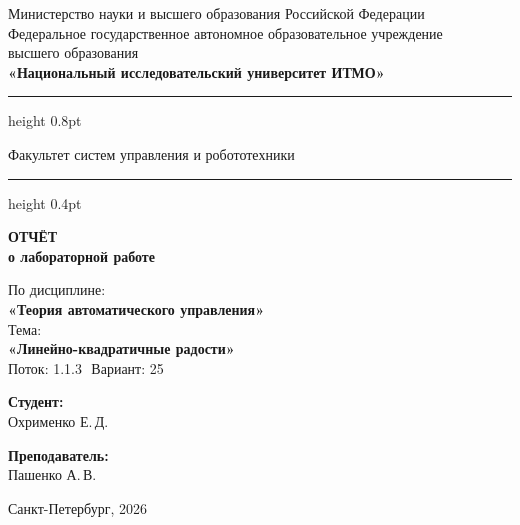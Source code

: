 \documentclass[a4paper,12pt]{article}
\begin{document}
	
	\begin{titlepage}
		\centering
		
		\vspace*{0.5cm}
		{\small
			Министерство науки и высшего образования Российской Федерации\\[2pt]
			Федеральное государственное автономное образовательное учреждение\\
			высшего образования\\[2pt]
			\textbf{«Национальный исследовательский университет ИТМО»}\\
		}
		
		\vspace{0.8cm}
		\hrule height 0.8pt
		\vspace{0.3cm}
		
		{\large Факультет систем управления и робототехники}
		
		\vspace{0.3cm}
		\hrule height 0.4pt
		\vspace{2.5cm}
		
		{\Huge\bfseries ОТЧЁТ}\\[0.4cm]
		{\LARGE\bfseries о лабораторной работе}\\[0.8cm]
		
		\begin{tcolorbox}[
			colback=gray!4,
			colframe=gray!10,
			boxrule=0.8pt,
			arc=4pt,
			left=12pt, right=12pt, top=8pt, bottom=8pt
			]
			\centering
			{\large По дисциплине:\\[4pt]}
			{\large\bfseries «Теория автоматического управления»}\\[10pt]
			{\large Тема:\\[4pt]}
			{\large\bfseries «Линейно-квадратичные радости»} \\[10pt]
			{\large Поток: 1.1.3 \( \) Вариант: 25}
		\end{tcolorbox}
		
		\vspace{3cm}
		
		\begin{minipage}{0.45\textwidth}
			\raggedright
			{\large\bfseries Студент:}\\[4pt]
			Охрименко Е.\,Д.\\
		\end{minipage}
		\hfill
		\begin{minipage}{0.45\textwidth}
			\raggedleft
			{\large\bfseries Преподаватель:}\\[4pt]
			Пашенко А.\,В.\\
		\end{minipage}
		
		\vfill
		\vspace{0.4cm}
		{\large Санкт-Петербург, 2026}
	\end{titlepage}
	
\end{document}
